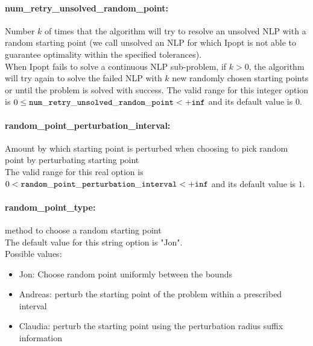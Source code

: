 \paragraph{\bf num\_retry\_unsolved\_random\_point:}\label{sec:num_retry_unsolved_random_point} Number $k$ of times that the algorithm will try to resolve an unsolved NLP with a random starting point (we call unsolved an NLP for which Ipopt is not able to guarantee optimality within the specified tolerances). $\;$ \\
 When Ipopt fails to solve a continuous NLP
sub-problem, if $k > 0$, the algorithm will try
again to solve the failed NLP with $k$ new
randomly chosen starting points  or until the
problem is solved with success. The valid range for this integer option is
$0 \le {\tt num\_retry\_unsolved\_random\_point } <  {\tt +inf}$
and its default value is $0$.


\paragraph{\bf random\_point\_perturbation\_interval:}\label{sec:random_point_perturbation_interval} Amount by which starting point is perturbed when choosing to pick random point by perturbating starting point $\;$ \\
 The valid range for this real option is 
$0 <  {\tt random\_point\_perturbation\_interval } <  {\tt +inf}$
and its default value is $1$.


\paragraph{\bf random\_point\_type:}\label{sec:random_point_type} method to choose a random starting point $\;$ \\

The default value for this string option is "Jon".
\\ 
Possible values:
\begin{itemize}
   \item Jon: Choose random point uniformly between the bounds
   \item Andreas: perturb the starting point of the problem
within a prescribed interval
   \item Claudia: perturb the starting point using the
perturbation radius suffix information
\end{itemize}

